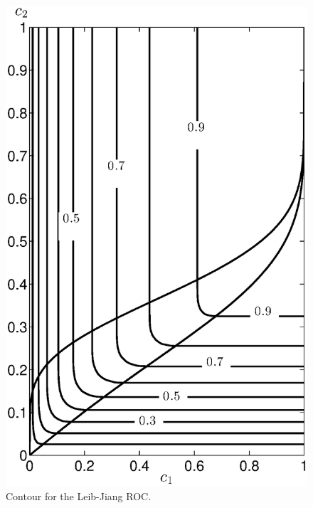 \documentclass[12pt,journal,a4paper,twoside,onecolumn,draft]{IEEEtran}
\begin{document}
\begin{spacing}{2.5}
\begin{figure}[!t]
\centering
\includegraphics[width=12cm]{LJcontour.eps}
\caption{Contour for the Leib-Jiang ROC.}
\label{pic: LJS contour}
\end{figure}



\end{spacing}
\end{document}
